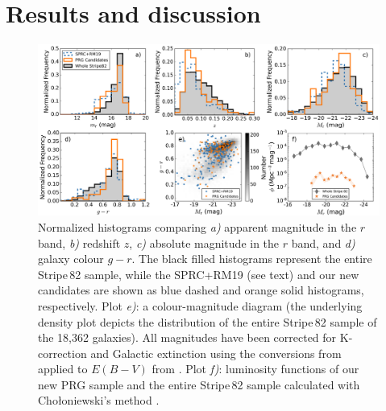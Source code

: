 \documentclass[letter]{aa}
\begin{document}
\section{Results and discussion}
\label{sec:properties}

\begin{figure}
\centering
    \includegraphics[width = \linewidth]{Images/all_plots.png}
    \caption{Normalized histograms comparing {\it a)} apparent magnitude in the $r$ band, {\it b)} redshift $z$, {\it c)} absolute magnitude in the $r$ band, and {\it d)} galaxy colour $g-r$. The black filled histograms represent the entire Stripe\,82 sample, while the SPRC+RM19 (see text)
    and our new candidates are shown as blue dashed and orange solid histograms, respectively. Plot {\it e)}: a colour-magnitude diagram (the underlying density plot depicts the distribution of the entire Stripe\,82 sample of the 18,362 galaxies). All magnitudes have been corrected for K-correction \citep{2010MNRAS.405.1409C,2012MNRAS.419.1727C} and Galactic extinction using the conversions from \citet{2011ApJ...737..103S} applied to $E(B-V)$ from \citet{1998ApJ...500..525S}. Plot {\it f)}: luminosity functions of our new PRG sample and the entire Stripe\,82 sample calculated with Cho\l{}oniewski's method \citep{1986MNRAS.223....1C}.}
    \label{fig:all_plots}
\end{figure}
\end{document}
